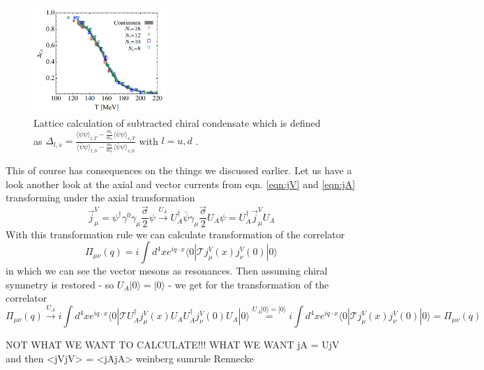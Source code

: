 \begin{figure}[b]
	\centering
	\includegraphics[width=0.45\textwidth]{Figures/ChiralOrderParameterLattice}
	\caption{Lattice calculation of subtracted chiral condensate which is defined as $ \Delta_{l,s} = \frac{\langle \bar{\psi} \psi \rangle_{l,T} - \frac{m_l}{m_s} \langle \bar{\psi} \psi \rangle_{s,T}}{\langle \bar{\psi} \psi \rangle_{l,0} - \frac{m_l}{m_s} \langle \bar{\psi} \psi \rangle_{s,0}}$ with $l = u,d$ \cite{OrdParLat}.}
	\label{fig:ordparlat}
\end{figure}
This of course has consequences on the things we discussed earlier. Let us have a look another look at the axial and vector currents from eqn. \ref{eqn:jV} and \ref{eqn:jA} transforming under the axial transformation
\begin{equation}
\vec{j}^V_{\mu} = \psi^{\dagger} \gamma^0 \gamma_{\mu} \frac{\vec{\sigma}}{2} \psi \overset{U_A}{\longrightarrow} U_A^{\dagger} \bar{\psi} \gamma_{\mu} \frac{\vec{\sigma}}{2} U_A \psi = U_A^{\dagger} \vec{j}^V_{\mu} U_A
\end{equation}
With this transformation rule we can calculate transformation of the correlator
\begin{equation}
\Pi_{\mu\nu} (q) = i \int d^4x e^{iq \cdot x} \langle 0 | \mathcal{T} j^V_{\mu}(x)j^V_{\nu}(0) | 0 \rangle
\end{equation}
in which we can see the vector mesons as resonances. Then assuming chiral symmetry is restored - so $U_A | 0 \rangle = | 0 \rangle$ - we get for the transformation of the correlator
\begin{equation}
\Pi_{\mu\nu}(q) \overset{U_A}{\longrightarrow} i \int d^4x e^{iq \cdot x} \langle 0 | \mathcal{T} U_A^{\dagger} j^V_{\mu}(x) U_A U_A^{\dagger} j^V_{\nu}(0) U_A | 0 \rangle \overset{U_A | 0 \rangle = | 0 \rangle}{=} i \int d^4x e^{iq \cdot x} \langle 0 | \mathcal{T} j^V_{\mu}(x)j^V_{\nu}(0) | 0 \rangle = \Pi_{\mu\nu} (q)
\end{equation}

NOT WHAT WE WANT TO CALCULATE!!! WHAT WE WANT jA = UjV and then <jVjV> = <jAjA> weinberg sumrule Rennecke

